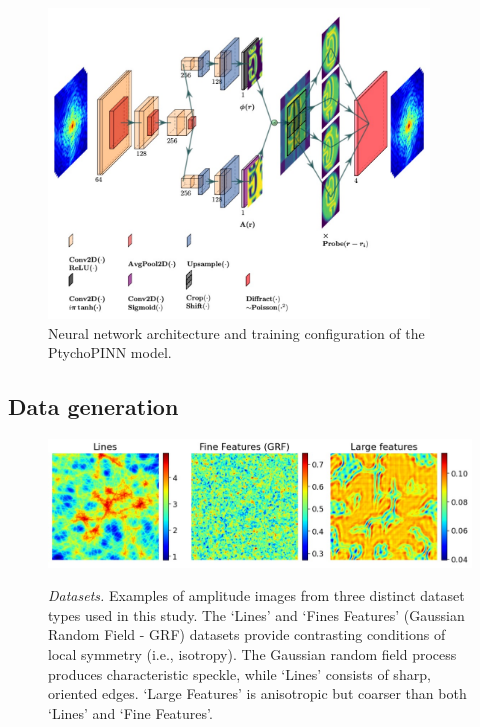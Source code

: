 \documentclass[sn-mathphys]{sn-jnl}%
\theoremstyle{thmstyleone}%
\theoremstyle{thmstyletwo}%
\theoremstyle{thmstylethree}%
\begin{document}
\begin{figure}[h]%
\centering
\includegraphics[width=0.9\textwidth]{lett.pdf}
\caption{Neural network architecture and training configuration of the PtychoPINN model.}\label{diagram}
\end{figure}

\subsection{Data generation}\label{data}

\begin{figure}
    \centering
    {{\includegraphics[width=12cm]{datasets.pdf} }}%
    \caption{\emph{Datasets.} Examples of amplitude images from three distinct dataset types used in this study. The `Lines' and `Fines Features' (Gaussian Random Field - GRF) datasets provide contrasting conditions of local symmetry (i.e., isotropy). The Gaussian random field process produces characteristic speckle, while `Lines' consists of sharp, oriented edges. `Large Features' is anisotropic but coarser than both `Lines' and `Fine Features'.}
    \label{fig:datasets}
\end{figure}
\end{document}

